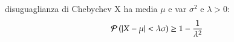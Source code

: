 disuguaglianza di Chebychev X ha media $\mu$ e var $\sigma^2$ e $\lambda>0$:
\[\operatorname{\mathcal{P}}{(|X-\mu|<\lambda\sigma)}\geq1-\frac{1}{\lambda^2}\]
